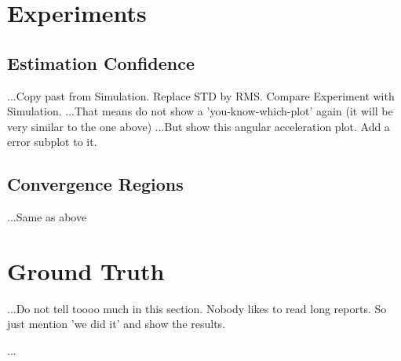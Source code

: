 \section{Experiments}
\subsection{Estimation Confidence}
...Copy past from Simulation. Replace STD by RMS. Compare Experiment with Simulation.
...That means do not show a 'you-know-which-plot' again (it will be very similar to the one above)
...But show this angular acceleration plot. Add a error subplot to it.
\subsection{Convergence Regions}
...Same as above
\section{Ground Truth}
...Do not tell toooo much in this section. Nobody likes to read long reports. So just mention 'we did it' and show the results.

...